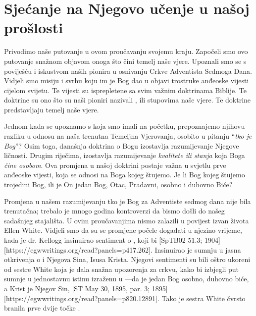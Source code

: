 \chapter{Sjećanje na Njegovo učenje u našoj prošlosti}

Privodimo naše putovanje u ovom proučavanju svojemu kraju. Započeli smo ovo putovanje snažnom objavom onoga što čini temelj naše vjere. Upoznali smo se s poviješću i iskustvom naših pionira u osnivanju Crkve Adventista Sedmoga Dana. Vidjeli smo misiju i svrhu koju im je Bog dao u objavi trostruke anđeoske vijesti cijelom svijetu. Te vijesti su isprepletene sa svim važnim doktrinama Biblije. Te doktrine su ono što su naši pioniri nazivali , ili stupovima naše vjere. Te doktrine predstavljaju temelj naše vjere.

Jednom kada se upoznamo s  koja smo imali na početku, prepoznajemo njihovu razliku u odnosu na naša trenutna Temeljna Vjerovanja, osobito u pitanju “\textit{tko je Bog}”? Osim toga, današnja doktrina o Bogu izostavlja razumijevanje Njegove ličnosti. Drugim riječima, izostavlja razumijevanje \textit{kvalitete ili stanja} koja Boga \textit{čine osobom}. Ova promjena u našoj doktrini postaje važna u svjetlu prve anđeoske vijesti, koja se odnosi na Boga kojeg štujemo. Je li Bog kojeg štujemo trojedini Bog, ili je On jedan Bog, Otac, Pradavni, osobno i duhovno Biće?

Promjena u našem razumijevanju tko je Bog za Adventiste sedmog dana nije bila trenutačna; trebalo je mnogo godina kontroverzi da bismo došli do našeg sadašnjeg stajališta. U ovim proučavanjima nismo zalazili u povijest izvan života Ellen White. Vidjeli smo da su se promjene počele događati u njezino vrijeme, kada je dr. Kellogg insinuirao sentiment o , koji bi [SpTB02 51.3; 1904][https://egwwritings.org/read?panels=p417.262]. Insinuirao je sumnju u jasna otkrivenja o  i Njegova Sina, Isusa Krista. Njegovi sentimenti su bili oštro ukoreni od sestre White koja je dala snažna upozorenja za crkvu, kako bi izbjegli put sumnje u jednostavnu istinu izraženu u —da je jedan Bog osobno, duhovno biće, a Krist je Njegov Sin, [ST May 30, 1895, par. 3; 1895][https://egwwritings.org/read?panels=p820.12891]. Tako je sestra White čvrsto branila prve dvije točke .

